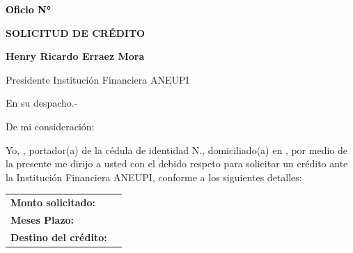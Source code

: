 \documentclass[a4paper,12pt]{article}
\begin{document}
\pagestyle{empty}

\vspace*{-4.5cm}
\noindent
\hfill
{\footnotesize \textcolor{black}{\textbf{Oficio N° }}}

\vspace{2.5cm}
\noindent
\hspace*{\dimexpr\textwidth+1cm\relax}

\begin{center}
    \textbf{\large SOLICITUD DE CRÉDITO}
\end{center}

\vspace{0.8cm}

\noindent \textbf{Henry Ricardo Erraez Mora} 

\noindent Presidente Institución Financiera ANEUPI 

\noindent En su despacho.-

\vspace{1cm}

\noindent De mi consideración:

\noindent Yo, \textbf{\underline{\hspace{6cm}}}, portador(a) de la cédula de identidad N.\textbf{\underline{\hspace{4cm}}}, domiciliado(a) en \textbf{\underline{\hspace{8cm}}}, por medio de la presente me dirijo a usted con el debido respeto para solicitar un crédito ante la Institución Financiera ANEUPI, conforme a los siguientes detalles:

\vspace{0.8cm}

\noindent
\begin{tabular}{p{4.5cm} p{8cm}}
\textbf{Monto solicitado:} & \textbf{\underline{\hspace{6cm}}} \\
\textbf{Meses Plazo:} & \textbf{\underline{\hspace{6cm}}} \\
\textbf{Destino del crédito:} & \textbf{\underline{\hspace{6cm}}} \\
\end{tabular}

\vspace{0.8cm}
\end{document}
